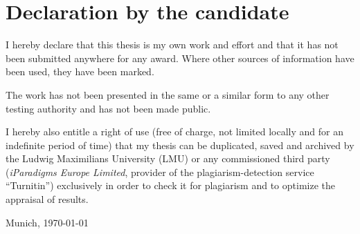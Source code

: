 %
%

\section*{Declaration by the candidate}

I hereby declare that this thesis is my own work and effort and that it has not been submitted anywhere for any award. Where other sources of information have been used, they have been marked.

\bigskip

The work has not been presented in the same or a similar form to any other testing authority and has not been made public.

\bigskip

I hereby also entitle a right of use (free of charge, not limited locally and for an indefinite period of time) that my thesis can be duplicated, saved and archived by the Ludwig Maximilians University (LMU) or any commissioned third party (\eg \emph{iParadigms Europe Limited}, provider of the plagiarism-detection service \enquote{Turnitin}) exclusively in order to check it for plagiarism and to optimize the appraisal of results.

\bigskip

Munich, \today

